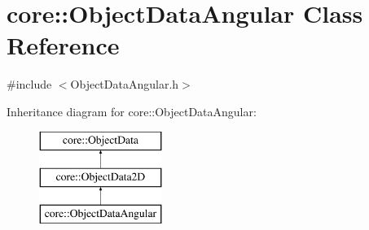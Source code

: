 \hypertarget{classcore_1_1ObjectDataAngular}{}\section{core\+:\+:Object\+Data\+Angular Class Reference}
\label{classcore_1_1ObjectDataAngular}


{\ttfamily \#include $<$Object\+Data\+Angular.\+h$>$}

Inheritance diagram for core\+:\+:Object\+Data\+Angular\+:\begin{figure}[H]
\begin{center}
\leavevmode
\includegraphics[height=3.000000cm]{classcore_1_1ObjectDataAngular}
\end{center}
\end{figure}
